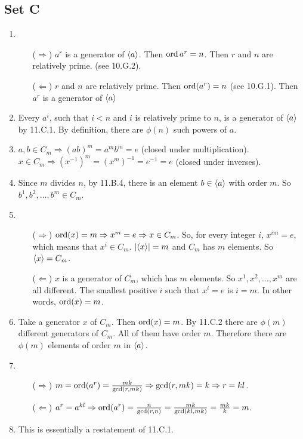 \subsection{Set C}
\begin{enumerate}
    \item
    \begin{enumerate}
        \item [($\Rightarrow$)] $a^r$ is a generator of $\langle a\rangle$. Then $\operatorname{ord}{a^r} = n$. Then $r$ and $n$ are relatively prime. (see 10.G.2).
        \item [($\Leftarrow$)] $r$ and $n$ are relatively prime. Then $\operatorname{ord}(a^r) = n$ (see 10.G.1). Then $a^r$ is a generator of $\langle a\rangle$
    \end{enumerate}

    \item Every $a^i$, such that $i < n$ and $i$ is relatively prime to $n$, is a  generator of $\langle a\rangle$ by 11.C.1. By definition, there are $\phi(n)$ such powers of $a$. 
    
    \item $a, b \in C_m \Rightarrow (ab)^m = a^mb^m = e$ (closed under multiplication). $x \in C_m \Rightarrow (x^{-1})^m = (x^m)^{-1} = e^{-1} = e$ (closed under inverses).
    
    \item Since $m$ divides $n$, by 11.B.4, there is an element $b \in \langle a\rangle$ with order $m$. So $b^1, b^2, \ldots, b^m \in C_m$. 
    
    \item 
    \begin{enumerate}
        \item [($\Rightarrow$)] $\operatorname{ord}(x) = m \Rightarrow x^m = e \Rightarrow x \in C_m$. So, for every integer $i$, $x^{im} = e$, which means that $x^i \in C_m$. $|\langle x\rangle| = m$ and $C_m$ has $m$ elements. So $\langle x\rangle = C_m$.
        \item [($\Leftarrow$)] $x$ is a generator of $C_m$, which has $m$ elements. So $x^1, x^2, \ldots, x^{m}$ are all different. The smallest positive $i$ such that $x^i = e$ is $i = m$. In other words, $\operatorname{ord}(x) = m$.
    \end{enumerate}

    \item Take a generator $x$ of $C_m$. Then $\operatorname{ord}(x) = m$. By 11.C.2 there are $\phi(m)$ different generators of $C_m$. All of them have order $m$. Therefore there are $\phi(m)$ elements of order $m$ in $\langle a\rangle$.

    \item 
    \begin{enumerate}
        \item [($\Rightarrow$)] $m = \operatorname{ord}(a^r) = \frac{mk}{\gcd(r, mk)} \Rightarrow \gcd(r, mk) = k \Rightarrow r = kl$.
        \item [($\Leftarrow$)] $a^r = a^{kl} \Rightarrow \operatorname{ord}(a^r) = \frac{n}{\gcd(r, n)} = \frac{mk}{\gcd(kl, mk)} = \frac{mk}{k} = m$.
    \end{enumerate}

    \item This is essentially a restatement of 11.C.1.

\end{enumerate}

